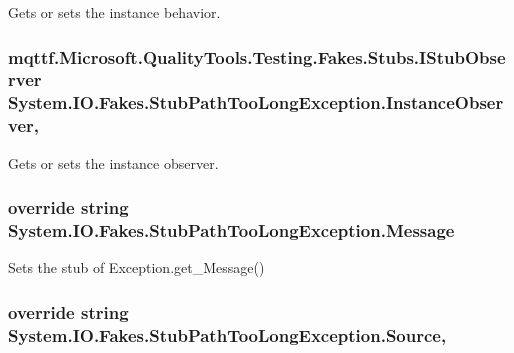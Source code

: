 Gets or sets the instance behavior.

\hypertarget{class_system_1_1_i_o_1_1_fakes_1_1_stub_path_too_long_exception_a55f56e84ddae62df8e939f2896b16981}{
\subsubsection[{Instance\-Observer}]{\setlength{\rightskip}{0pt plus 5cm}mqttf.\-Microsoft.\-Quality\-Tools.\-Testing.\-Fakes.\-Stubs.\-I\-Stub\-Observer System.\-I\-O.\-Fakes.\-Stub\-Path\-Too\-Long\-Exception.\-Instance\-Observer\hspace{0.3cm}{\ttfamily [get]}, {\ttfamily [set]}}}\label{class_system_1_1_i_o_1_1_fakes_1_1_stub_path_too_long_exception_a55f56e84ddae62df8e939f2896b16981}


Gets or sets the instance observer.

\hypertarget{class_system_1_1_i_o_1_1_fakes_1_1_stub_path_too_long_exception_ae62e5f86bb3b87c3ed0519297b35da17}{
\subsubsection[{Message}]{\setlength{\rightskip}{0pt plus 5cm}override string System.\-I\-O.\-Fakes.\-Stub\-Path\-Too\-Long\-Exception.\-Message\hspace{0.3cm}{\ttfamily [get]}}}\label{class_system_1_1_i_o_1_1_fakes_1_1_stub_path_too_long_exception_ae62e5f86bb3b87c3ed0519297b35da17}


Sets the stub of Exception.\-get\-\_\-\-Message()

\hypertarget{class_system_1_1_i_o_1_1_fakes_1_1_stub_path_too_long_exception_a50004971c2fba15f5a66592850d06a0c}{
\subsubsection[{Source}]{\setlength{\rightskip}{0pt plus 5cm}override string System.\-I\-O.\-Fakes.\-Stub\-Path\-Too\-Long\-Exception.\-Source\hspace{0.3cm}{\ttfamily [get]}, {\ttfamily [set]}}}\label{class_system_1_1_i_o_1_1_fakes_1_1_stub_path_too_long_exception_a50004971c2fba15f5a66592850d06a0c}


